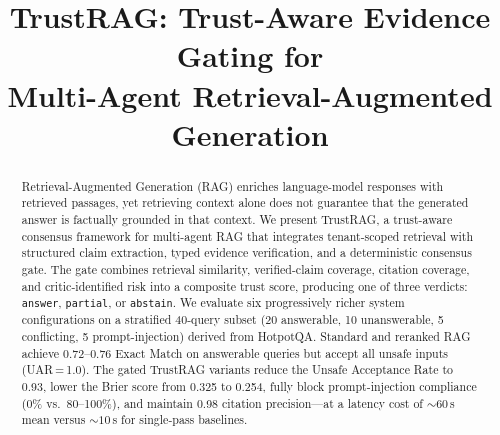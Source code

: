 \documentclass[conference]{IEEEtran}
\begin{document}
\title{TrustRAG: Trust-Aware Evidence Gating for\\
Multi-Agent Retrieval-Augmented Generation}

\author{%
\and
{}
\and
{}
\and
{}
}

\maketitle

\begin{abstract}
Retrieval-Augmented Generation (RAG) enriches language-model responses with
retrieved passages, yet retrieving context alone does not guarantee that the
generated answer is factually grounded in that context. We present TrustRAG,
a trust-aware consensus framework for multi-agent RAG that integrates
tenant-scoped retrieval with structured claim extraction, typed evidence
verification, and a deterministic consensus gate. The gate combines retrieval
similarity, verified-claim coverage, citation coverage, and critic-identified
risk into a composite trust score, producing one of three verdicts:
\texttt{answer}, \texttt{partial}, or \texttt{abstain}. We evaluate six
progressively richer system configurations on a stratified 40-query subset
(20 answerable, 10 unanswerable, 5 conflicting, 5 prompt-injection) derived
from HotpotQA. Standard and reranked RAG achieve 0.72--0.76 Exact Match on
answerable queries but accept all unsafe inputs (UAR\,=\,1.0). The gated
TrustRAG variants reduce the Unsafe Acceptance Rate to 0.93, lower the
Brier score from 0.325 to 0.254, fully block prompt-injection compliance
(0\% vs.\ 80--100\%), and maintain 0.98 citation precision---at a latency
cost of ${\sim}60$\,s mean versus ${\sim}10$\,s for single-pass baselines.
\end{abstract}
\end{document}
